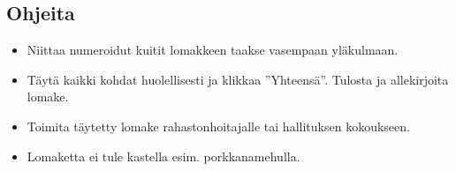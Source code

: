 \documentclass[a4paper,12pt,finnish]{scrartcl}
\begin{document}
\vspace*{1cm}


\subsection*{Ohjeita}
\begin{itemize}
\item Niittaa numeroidut kuitit lomakkeen taakse vasempaan yl\"{a}kulmaan.
\item T\"{a}yt\"{a} kaikki kohdat huolellisesti ja klikkaa ''Yhteensä''. Tulosta ja allekirjoita lomake.
\item Toimita t\"{a}ytetty lomake rahastonhoitajalle tai hallituksen kokoukseen.
\item Lomaketta ei tule kastella esim. porkkanamehulla.
\end{itemize}
\end{document}

